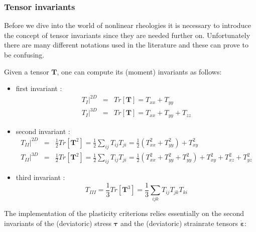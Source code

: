 
\subsubsection{Tensor invariants}

Before we dive into the world of nonlinear rheologies it is necessary to introduce the concept of tensor 
invariants since they are needed further on. 
Unfortunately there are many different notations used in the literature and these can prove to be 
confusing.

Given a tensor $\bm{T}$,  one can compute its (moment) invariants as follows:
\begin{itemize}
\item first invariant : 
\begin{eqnarray}
T_I|^{2D} &=& Tr[\bm{T}] = T_{xx} + T_{yy} \nonumber\\
T_I|^{3D} &=& Tr[\bm{T}] = T_{xx} + T_{yy} + T_{zz} \nonumber
\end{eqnarray}
\item second invariant :
\begin{eqnarray}
T_{II}|^{2D} &=& \frac{1}{2} Tr[{\bm{T}^2}] = \frac{1}{2} \sum_{ij} T_{ij} T_{ji} = \frac{1}{2} (T_{xx}^2 + T_{yy}^2) + T_{xy}^2 \nonumber\\
T_{II}|^{3D} &=& \frac{1}{2} Tr[{\bm{T}^2}] = \frac{1}{2} \sum_{ij} T_{ij} T_{ji} = \frac{1}{2} (T_{xx}^2 + T_{yy}^2 + T_{yy}^2) + T_{xy}^2 + T_{xz}^2 + T_{yz}^2 \nonumber
\end{eqnarray}
\item third invariant : 
\[
T_{III} = \frac{1}{3} Tr[{\bm{T}^3}]  = \frac{1}{3}\sum_{ijk} T_{ij} T_{jk} T_{ki} 
\]
\end{itemize}


The implementation of the plasticity criterions relies essentially 
on the second invariants of the (deviatoric) stress ${\bm \tau}$ and the (deviatoric) strainrate tensors $\dot{\bm \varepsilon}$:

